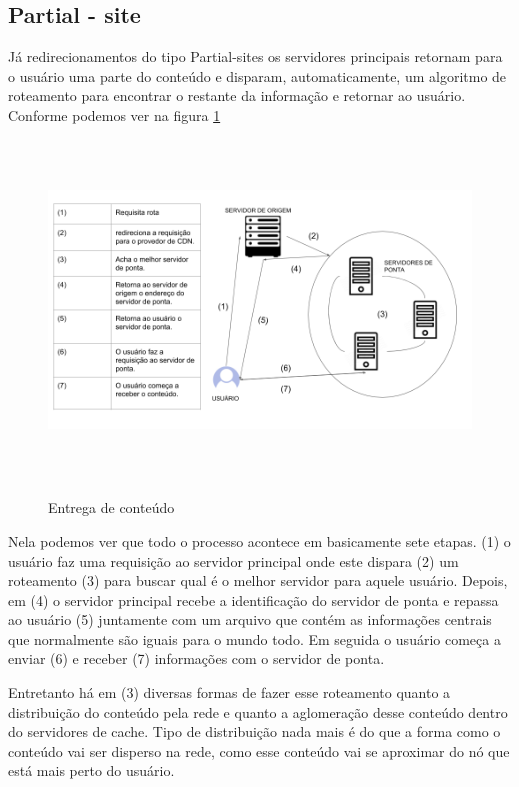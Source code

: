 \subsection{Partial - site}
J\'a redirecionamentos do tipo Partial-sites os servidores principais retornam para o usu\'ario uma parte do conte\'udo e disparam, automaticamente, um algoritmo de roteamento para encontrar o restante da informa\c{c}\~ao e retornar ao usu\'ario. Conforme podemos ver na figura \ref{figura:entrega_conteudo}
\begin{figure}[H]
\caption{Entrega de conte\'udo}
\includegraphics[height=9cm]{Figuras/entrega_conteudo.png} 
\label{figura:entrega_conteudo}
\end{figure}
Nela podemos ver que todo o processo acontece em basicamente sete etapas. (1) o usu\'ario faz uma requisi\c{c}\~ao ao servidor principal onde este dispara (2) um roteamento (3) para buscar qual \'e o melhor servidor para aquele usu\'ario. Depois, em (4) o servidor principal recebe a identifica\c{c}\~ao do servidor de ponta e repassa ao usu\'ario (5) juntamente com um arquivo que cont\'em as informa\c{c}\~oes centrais que normalmente s\~ao iguais para o mundo todo. Em seguida o usu\'ario come\c{c}a a enviar (6) e receber (7) informa\c{c}\~oes com o servidor de ponta.

 Entretanto h\'a em (3) diversas formas de fazer esse roteamento quanto a distribui\c{c}\~ao do conte\'udo pela rede e quanto a aglomera\c{c}\~ao desse conte\'udo dentro do servidores de cache. 
 Tipo de distribui\c{c}\~ao nada mais \'e do que a forma como o conte\'udo vai ser disperso na rede, como esse conte\'udo vai se aproximar do n\'o que est\'a mais perto do usu\'ario. 


